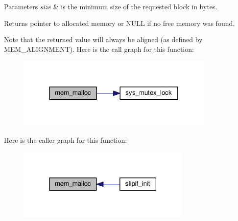 \begin{DoxyParams}{Parameters}
{\em size} & is the minimum size of the requested block in bytes. \\
\hline
\end{DoxyParams}
\begin{DoxyReturn}{Returns}
pointer to allocated memory or N\+U\+LL if no free memory was found.
\end{DoxyReturn}
Note that the returned value will always be aligned (as defined by M\+E\+M\+\_\+\+A\+L\+I\+G\+N\+M\+E\+NT). Here is the call graph for this function\+:
\nopagebreak
\begin{figure}[H]
\begin{center}
\leavevmode
\includegraphics[width=276pt]{openmote-cc2538_2lwip_2src_2include_2lwip_2mem_8h_a932aa40d85b14cb7331625e012d12335_cgraph}
\end{center}
\end{figure}
Here is the caller graph for this function\+:
\nopagebreak
\begin{figure}[H]
\begin{center}
\leavevmode
\includegraphics[width=243pt]{openmote-cc2538_2lwip_2src_2include_2lwip_2mem_8h_a932aa40d85b14cb7331625e012d12335_icgraph}
\end{center}
\end{figure}
\mbox{\label{openmote-cc2538_2lwip_2src_2include_2lwip_2mem_8h_a5e39a108c44d8a72df0b30a117cb62e4}} 
